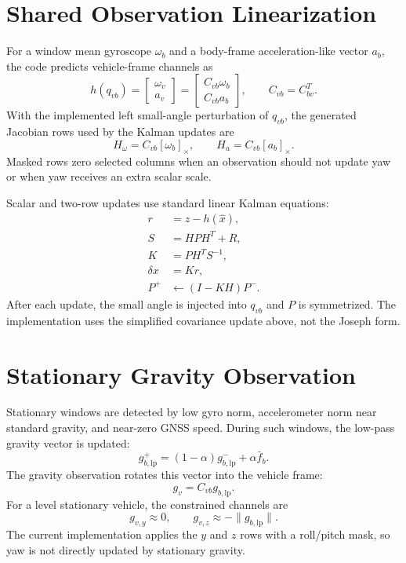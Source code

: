 \documentclass[11pt]{article}
\newcommand{\crossmat}[1]{\left[#1\right]_\times}
\newcommand{\T}{^{T}}
\begin{document}
\section{Shared Observation Linearization}

For a window mean gyroscope \(\omega_b\) and a body-frame acceleration-like
vector \(a_b\), the code predicts vehicle-frame channels as
\begin{equation}
  h(q_{vb}) =
  \begin{bmatrix}
  \omega_v \\ a_v
  \end{bmatrix}
  =
  \begin{bmatrix}
  C_{vb}\omega_b \\ C_{vb}a_b
  \end{bmatrix},
  \qquad C_{vb}=C_{bv}\T .
\end{equation}
With the implemented left small-angle perturbation of \(q_{vb}\), the generated
Jacobian rows used by the Kalman updates are
\begin{equation}
  H_\omega = C_{vb}\crossmat{\omega_b},
  \qquad
  H_a = C_{vb}\crossmat{a_b}.
\end{equation}
Masked rows zero selected columns when an observation should not update yaw or
when yaw receives an extra scalar scale.

Scalar and two-row updates use standard linear Kalman equations:
\begin{align}
  r &= z-h(\hat x),\\
  S &= HPH\T+R,\\
  K &= PH\T S^{-1},\\
  \delta x &= Kr,\\
  P^{+} &\leftarrow (I-KH)P^{-}.
\end{align}
After each update, the small angle is injected into \(q_{vb}\) and \(P\) is
symmetrized. The implementation uses the simplified covariance update above,
not the Joseph form.

\section{Stationary Gravity Observation}

Stationary windows are detected by low gyro norm, accelerometer norm near
standard gravity, and near-zero GNSS speed. During such windows, the low-pass
gravity vector is updated:
\begin{equation}
  g_{b,\mathrm{lp}}^{+}
  =(1-\alpha)g_{b,\mathrm{lp}}^{-}+\alpha\bar f_b .
\end{equation}
The gravity observation rotates this vector into the vehicle frame:
\begin{equation}
  g_v=C_{vb}g_{b,\mathrm{lp}} .
\end{equation}
For a level stationary vehicle, the constrained channels are
\begin{equation}
  g_{v,y}\approx 0,\qquad g_{v,z}\approx -\|g_{b,\mathrm{lp}}\|.
\end{equation}
The current implementation applies the \(y\) and \(z\) rows with a roll/pitch
mask, so yaw is not directly updated by stationary gravity.
\end{document}

